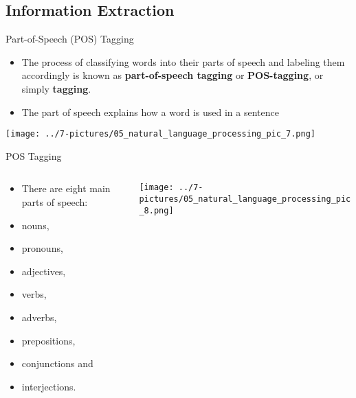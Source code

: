 \documentclass[11pt]{beamer}
\begin{document}
\subsection{Information Extraction}
\begin{frame}{Part-of-Speech (POS) Tagging}
	\begin{itemize}
		\item The process of classifying words into their parts of speech and labeling them accordingly is known as \textbf{part-of-speech tagging} or  \textbf{ POS-tagging}, or simply  \textbf{ tagging}.
		\item The part of speech explains how a word is used in a sentence
	\end{itemize}
	\begin{center}
	\texttt{[image: ../7-pictures/05\_natural\_language\_processing\_pic\_7.png]}
	\end{center}
\end{frame}
\begin{frame}{POS Tagging}
\begin{columns}[T] %
\begin{column}{.48\textwidth}
        \begin{itemize}
		\item There are eight main parts of speech: 
		\item nouns, 
		\item pronouns, 
		\item adjectives, 
		\item verbs, 
		\item adverbs, 
		\item prepositions, 
		\item conjunctions and 
		\item interjections.
        \end{itemize}
\end{column}%
\hfill%
\begin{column}{.48\textwidth}
        \texttt{[image: ../7-pictures/05\_natural\_language\_processing\_pic\_8.png]}
\end{column}%
\end{columns}
\end{frame}
\end{document}
